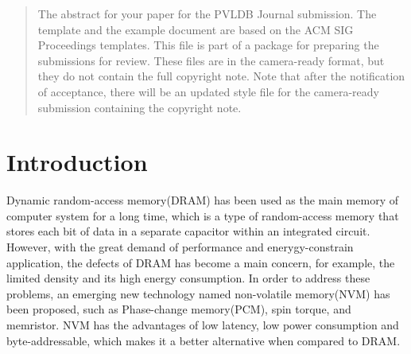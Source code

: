\documentclass{vldb}
\begin{document}
\date{30 July 1999}


\maketitle

\begin{abstract}
The abstract for your paper for the PVLDB Journal submission.
The template and the example document are based on the ACM SIG Proceedings  templates. This file is part of a package for preparing the submissions for review. These files are in the camera-ready format, but they do not contain the full copyright note.
Note that after the notification of acceptance, there will be an updated style file for the camera-ready submission containing the copyright note.
\end{abstract}



\section{Introduction}

Dynamic random-access memory(DRAM) has been used as the main memory of computer system for a long time, which is a type of random-access memory that stores each bit of data in a separate capacitor within an integrated circuit. 
However, with the great demand of performance and enerygy-constrain application, the defects of DRAM has become a main concern, for example, the limited density and its high energy consumption. 
In order to address these problems, an emerging new technology named non-volatile memory(NVM) has been proposed, such as Phase-change memory(PCM), spin torque, and memristor. 
NVM has the advantages of low latency, low power consumption and byte-addressable, which makes it a better alternative when compared  to DRAM.
\end{document}
